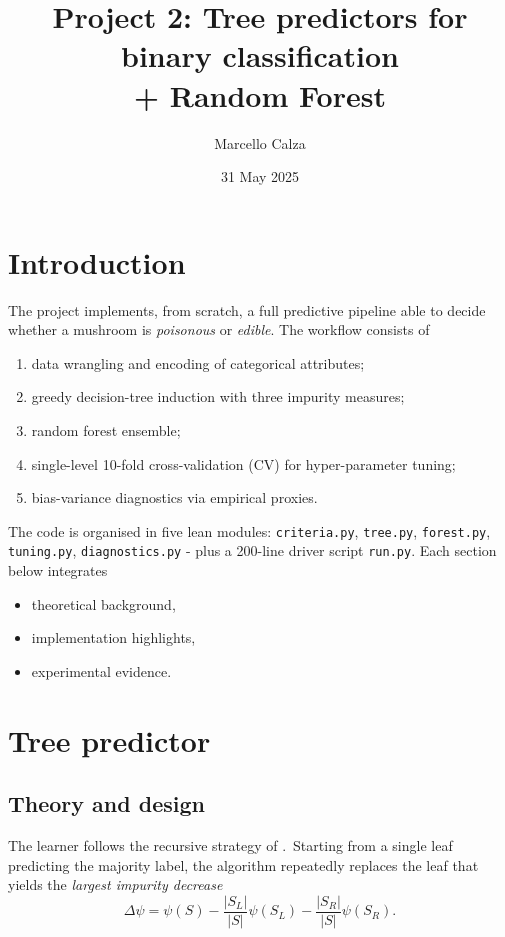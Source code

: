 \documentclass[12pt]{report}
\title{\bfseries%
Project 2: Tree predictors for binary classification\\[4pt]
\large + Random Forest}
\author{Marcello Calza}
\date{31 May 2025}
\begin{document}
\maketitle
\tableofcontents
\clearpage

\section{Introduction}

The project implements, from scratch, a full predictive pipeline able to decide whether
a mushroom is \textit{poisonous} or \textit{edible}. The workflow consists of

\begin{enumerate}
  \item data wrangling and encoding of categorical attributes;
  \item greedy decision-tree induction with three impurity measures;
  \item random forest ensemble;
  \item single-level 10-fold cross-validation (CV) for hyper-parameter tuning;
  \item bias-variance diagnostics via empirical proxies.
\end{enumerate}

The code is organised in five lean modules: \texttt{criteria.py}, \texttt{tree.py},
\texttt{forest.py}, \texttt{tuning.py}, \texttt{diagnostics.py} - plus a 200-line driver
script \texttt{run.py}.  Each section below integrates

\begin{itemize}
  \item theoretical background,
  \item implementation highlights,
  \item experimental evidence.
\end{itemize}

\section{Tree predictor}

\subsection{Theory and design}
The learner follows the recursive strategy of \citet[pp.\,253-254]{shalev}.\
Starting from a single leaf predicting the majority label, the algorithm repeatedly
replaces the leaf that yields the \emph{largest impurity decrease}
\[
  \Delta\psi
  =\psi(S)
  -\frac{|S_L|}{|S|}\psi(S_L)
  -\frac{|S_R|}{|S|}\psi(S_R).
\]
\end{document}
